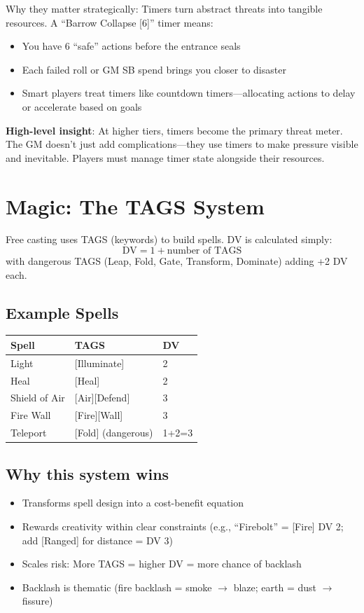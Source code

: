 \documentclass[11pt]{article}
\begin{document}
Why they matter strategically: Timers turn abstract threats into tangible resources. A ``Barrow Collapse [6]'' timer means:
\begin{itemize}
    \item You have 6 ``safe'' actions before the entrance seals
    \item Each failed roll or GM SB spend brings you closer to disaster
    \item Smart players treat timers like countdown timers---allocating actions to delay or accelerate based on goals
\end{itemize}

\textbf{High-level insight}: At higher tiers, timers become the primary threat meter. The GM doesn't just add complications---they use timers to make pressure visible and inevitable. Players must manage timer state alongside their resources.

\section{Magic: The TAGS System}

Free casting uses TAGS (keywords) to build spells. DV is calculated simply:
\[
\text{DV} = 1 + \text{number of TAGS}
\]
with dangerous TAGS (Leap, Fold, Gate, Transform, Dominate) adding +2 DV each.

\subsection{Example Spells}
\begin{table}[h]
\centering
\begin{tabular}{lll}
\toprule
\textbf{Spell} & \textbf{TAGS} & \textbf{DV} \\
\midrule
Light & [Illuminate] & 2 \\
Heal & [Heal] & 2 \\
Shield of Air & [Air][Defend] & 3 \\
Fire Wall & [Fire][Wall] & 3 \\
Teleport & [Fold] (dangerous) & 1+2=3 \\
\bottomrule
\end{tabular}
\end{table}

\subsection{Why this system wins}
\begin{itemize}
    \item Transforms spell design into a cost-benefit equation
    \item Rewards creativity within clear constraints (e.g., ``Firebolt'' = [Fire] DV 2; add [Ranged] for distance = DV 3)
    \item Scales risk: More TAGS = higher DV = more chance of backlash
    \item Backlash is thematic (fire backlash = smoke $\rightarrow$ blaze; earth = dust $\rightarrow$ fissure)
\end{itemize}
\end{document}
